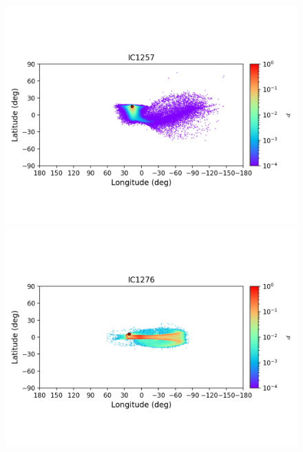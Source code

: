 \begin{figure}
\begin{center}
                \includegraphics[clip=true, trim = 0mm 20mm 0mm 10mm, width=1\columnwidth]{images/error_plots_IC1257.png}
                \includegraphics[clip=true, trim = 0mm 20mm 0mm 10mm, width=1\columnwidth]{images/error_plots_IC1276.png}
                

\end{center}
\end{figure}
